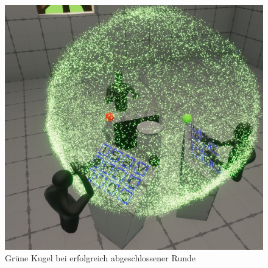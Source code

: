 \documentclass[a4paper,11pt]{article}%
\renewcommand{\\}{\vspace*{0.5\baselineskip} \newline}
\begin{document}
\begin{figure}[H]
		\begin{footnotesize}
		\centering
			\includegraphics[scale=0.2]{Abbildungen/RoundSuccsessful.JPG}
			
			\caption[Abbildung 1]{Grüne Kugel bei erfolgreich abgeschlossener Runde}
			\label{RoundFinished}
		\end{footnotesize}
	\end{figure}

\newpage
\end{document}
